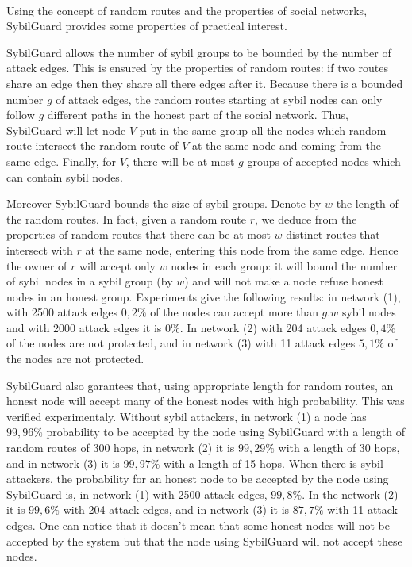 \documentclass[a4paper,11pt]{article}
\begin{document}

\paragraph{}
Using the concept of random routes and the properties of social networks, SybilGuard provides some properties of practical interest.

SybilGuard allows the number of sybil groups to be bounded by the number of attack edges.
This is ensured by the properties of random routes: if two routes share an edge then they share all there edges after it.
Because there is a bounded number $g$ of attack edges, the random routes starting at sybil nodes can only follow $g$ different paths in the honest part of the social network.
Thus, SybilGuard will let node $V$ put in the same group all the nodes which random route intersect the random route of $V$ at the same node and coming from the same edge.
Finally, for $V$, there will be at most $g$ groups of accepted nodes which can contain sybil nodes. 

Moreover SybilGuard bounds the size of sybil groups.
Denote by $w$ the length of the random routes.
In fact, given a random route $r$, we deduce from the properties of random routes that there can be at most $w$ distinct routes that intersect with $r$ at the same node, entering this node from the same edge.
Hence the owner of $r$ will accept only $w$ nodes in each group: it will bound the number of sybil nodes in a sybil group (by $w$) and will not make a node refuse honest nodes in an honest group.
Experiments give the following results: in network (1), with 2500 attack edges $0,2\%$ of the nodes can accept more than $g.w$ sybil nodes and with 2000 attack edges it is $0\%$.
In network (2) with 204 attack edges $0,4\%$ of the nodes are not protected, and in network (3) with 11 attack edges $5,1\%$ of the nodes are not protected.

SybilGuard also garantees that, using appropriate length for random routes, an honest node will accept many of the honest nodes with high probability. 
This was verified experimentaly.
Without sybil attackers, in network (1) a node has $99,96\%$ probability to be accepted by the node using SybilGuard with a length of random routes of 300 hops, in network (2) it is $99,29\%$ with a length of 30 hops, and in network (3) it is $99,97\%$ with a length of 15 hops.
When there is sybil attackers, the probability for an honest node to be accepted by the node using SybilGuard is, in network (1) with 2500 attack edges, $99,8\%$.
In the network (2) it is $99,6\%$ with 204 attack edges, and in network (3) it is $87,7\%$ with 11 attack edges.
One can notice that it doesn't mean that some honest nodes will not be accepted by the system but that the node using SybilGuard will not accept these nodes.
\end{document}
